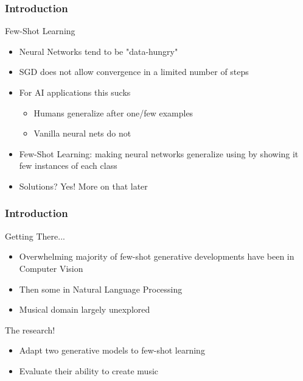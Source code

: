 \documentclass{beamer}
\begin{document}
\begin{frame}
    \frametitle{Introduction}
    \begin{block}{Few-Shot Learning}
        \begin{itemize}
            \item Neural Networks tend to be "data-hungry"
            \item SGD does not allow convergence in a limited number of steps
            \item For AI applications this sucks
                \begin{itemize}
                    \item Humans generalize after one/few examples
                    \item Vanilla neural nets do not
                \end{itemize}
            \item Few-Shot Learning: making neural networks generalize using by showing it few instances of each class
            \item Solutions? Yes! More on that later
        \end{itemize}
    \end{block}
\end{frame}

\begin{frame}
    \frametitle{Introduction}
    \begin{block}{Getting There...}
        \begin{itemize}
            \item Overwhelming majority of few-shot generative developments have been in Computer Vision
            \item Then some in Natural Language Processing
            \item Musical domain largely unexplored
        \end{itemize}
    \end{block}

    \begin{block}{The research!}
        \begin{itemize}
            \item Adapt two generative models to few-shot learning
            \item Evaluate their ability to create music
        \end{itemize}
    \end{block}
\end{frame}
\end{document}
